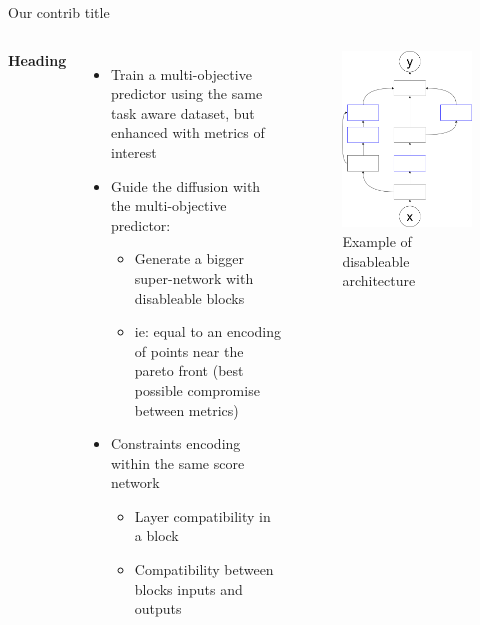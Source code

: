 \documentclass[aspectratio=169,xcolor=dvipsnames]{beamer}
\begin{document}
\begin{frame}{Our contrib title}
    \begin{columns}[c]
        \textbf{Heading}
        \begin{itemize}
            \item Train a multi-objective predictor using the same task aware dataset, but enhanced with metrics of interest
            \item Guide the diffusion with the multi-objective predictor:
                \begin{itemize}
                    \item Generate a bigger super-network with disableable blocks
                    \item ie: equal to an encoding of points near the pareto front (best possible compromise between metrics)
                \end{itemize}
            \item Constraints encoding within the same score network
                \begin{itemize}
                    \item Layer compatibility in a block
                    \item Compatibility between blocks inputs and outputs
                \end{itemize}
        \end{itemize}

        \begin{figure}[htbp]
            \centering
            \includegraphics[width=.7\textwidth]{base_diagram.drawio.png}
            \caption{Example of disableable architecture}
        \end{figure}
    \end{columns}
\end{frame}
\end{document}
